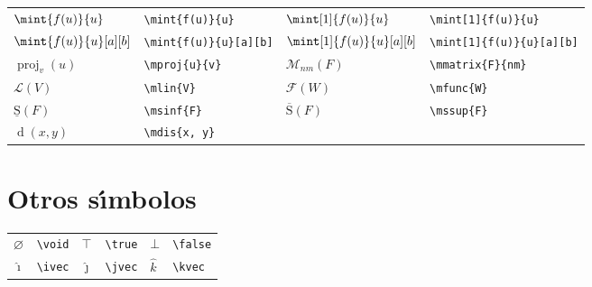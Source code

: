 \documentclass[10pt, a4paper]{article}
\newcommand{\ds}{\displaystyle}
\newcommand{\mproj}[2]{\operatorname{proj}_{#2}\left(#1\right)}
\newcommand{\mmatrix}[2]{\mathcal{M}_{#2}\left( #1 \right)}
\newcommand{\mlin}[1]{\mathcal{L}\left( #1 \right)}
\newcommand{\mfunc}[1]{\mathcal{F}\left( #1 \right)}
\newcommand{\mdis}[1]{\operatorname{d}\left( #1 \right)}
\newcommand{\msinf}[1]{\operatorname{\underline{S}}\left( #1 \right)}
\newcommand{\mssup}[1]{\operatorname{\overline{S}}\left( #1 \right)}
\newcommand{\void}{\varnothing}
\newcommand{\true}{\top}
\newcommand{\false}{\bot}
\newcommand{\ivec}{\hat{\imath}}
\newcommand{\jvec}{\hat{\jmath}}
\newcommand{\kvec}{\hat{k}}
\begin{document}
\begin{center}
\begin{tabular}{ll|ll}
		$ \ds\mint{f(u)}{u} $ & \texttt{\textbackslash mint\{f(u)\}\{u\}} & $ \ds\mint[1]{f(u)}{u} $ & \texttt{\textbackslash mint[1]\{f(u)\}\{u\}}\\
		$ \ds\mint{f(u)}{u}[a][b] $ & \texttt{\textbackslash mint\{f(u)\}\{u\}[a][b]} & $ \ds\mint[1]{f(u)}{u}[a][b] $ & \texttt{\textbackslash mint[1]\{f(u)\}\{u\}[a][b]}\\
		$ \mproj{u}{v} $ & \texttt{\textbackslash mproj\{u\}\{v\}} & $ \mmatrix{F}{nm} $ & \texttt{\textbackslash mmatrix\{F\}\{nm\}}\\
		$ \mlin{V} $ & \texttt{\textbackslash mlin\{V\}} & $ \mfunc{W} $ & \texttt{\textbackslash mfunc\{W\}}\\
		$ \msinf{F} $ & \texttt{\textbackslash msinf\{F\}} & $ \mssup{F} $ & \texttt{\textbackslash mssup\{F\}}\\
		$ \mdis{x, y} $ & \texttt{\textbackslash mdis\{x, y\}} & &
	\end{tabular}
\end{center}
\section{Otros s\'{\i}mbolos}
\begin{center}
	\begin{tabular}{ll|ll|ll}
		$ \void $ & \texttt{\textbackslash void} & $ \true $ & \texttt{\textbackslash true} & $ \false $ & \texttt{\textbackslash false}\\
		$ \ivec $ & \texttt{\textbackslash ivec} & $ \jvec $ & \texttt{\textbackslash jvec} & $ \kvec $ & \texttt{\textbackslash kvec}
	\end{tabular}
\end{center}
\end{document}
